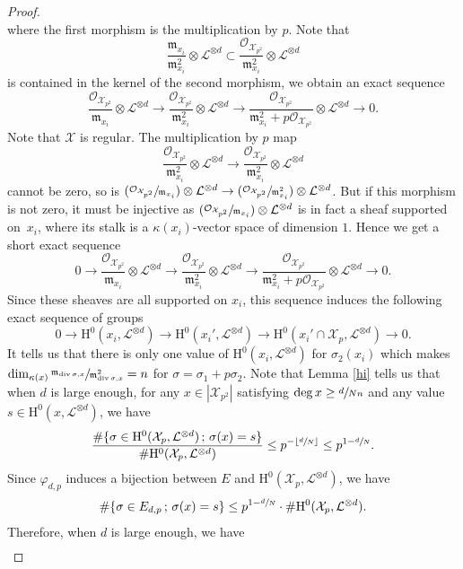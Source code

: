 \documentclass[11pt]{article}
\numberwithin{equation}{section}
\newcommand{\Psfrac}[2]{(\sfrac{#1}{#2})}
\newcommand{\sep}{\,;\,}
\theoremstyle{plain}
\theoremstyle{definition}
\newcommand{\ho}{\mathrm{H}}
\newcommand{\X}{\mathcal{X}}
\newcommand{\li}{\mathcal{L}}
\begin{document}
\begin{proof}
\[\]
where the first morphism is the multiplication by $p$. Note that
\[
\frac{\mathfrak{m}_{x_i}}{\mathfrak{m}_{x_i}^2}\otimes \li^{\otimes d}\subset \frac{\mathcal{O}_{\X_{p^2}}}{\mathfrak{m}_{x_i}^2}\otimes \li^{\otimes d}
\]
is contained in the kernel of the second morphism, we obtain an exact sequence
\[
\frac{\mathcal{O}_{\X_{p^2}}}{\mathfrak{m}_{x_i}}\otimes \li^{\otimes d} \to \frac{\mathcal{O}_{\X_{p^2}}}{\mathfrak{m}_{x_i}^2}\otimes \li^{\otimes d} \to \frac{\mathcal{O}_{\X_{p^2}}}{\mathfrak{m}_{x_i}^2+p\mathcal{O}_{\X_{p^2}}}\otimes \li^{\otimes d}\to 0.
\]
Note that $\X$ is regular. The multiplication by $p$ map
\[
\frac{\mathcal{O}_{\X_{p^2}}}{\mathfrak{m}_{x_i}^2}\otimes \li^{\otimes d} \to \frac{\mathcal{O}_{\X_{p^2}}}{\mathfrak{m}_{x_i}^2}\otimes \li^{\otimes d}
\]
cannot be zero, so is $ \Psfrac{\mathcal{O}_{\X_{p^2}}}{\mathfrak{m}_{x_i}}\otimes \li^{\otimes d} \to \Psfrac{\mathcal{O}_{\X_{p^2}}}{\mathfrak{m}_{x_i}^2}\otimes \li^{\otimes d}$. But if this morphism is not zero, it must be injective as $\Psfrac{\mathcal{O}_{\X_{p^2}}}{\mathfrak{m}_{x_i}}\otimes \li^{\otimes d} $ is in fact a sheaf supported on~$x_i$, where its stalk is a $\kappa(x_i)$-vector space of dimension $1$. Hence we get a short exact sequence
\[
0\to \frac{\mathcal{O}_{\X_{p^2}}}{\mathfrak{m}_{x_i}}\otimes \li^{\otimes d} \to \frac{\mathcal{O}_{\X_{p^2}}}{\mathfrak{m}_{x_i}^2}\otimes \li^{\otimes d} \to \frac{\mathcal{O}_{\X_{p^2}}}{\mathfrak{m}_{x_i}^2+p\mathcal{O}_{\X_{p^2}}}\otimes \li^{\otimes d}\to 0.
\]
Since these sheaves are all supported on $x_i$, this sequence induces the following exact sequence of groups
\[
0\to \ho^0(x_i, \li^{\otimes d})\to \ho^0(x_i', \li^{\otimes d}) \to \ho^0(x_i'\cap \X_p, \li^{\otimes d}) \to 0.
\]
It tells us that there is only one value of $ \ho^0(x_i, \li^{\otimes d})$ for $\sigma_2(x_i)$ which makes $\dim_{\kappa(x)}\sfrac{\mathfrak{m}_{\operatorname{div} \sigma,x}}{\mathfrak{m}_{\operatorname{div} \sigma,x}^2}=n$ for $\sigma=\sigma_1+p\sigma_2$. Note that Lemma \ref{hi} tells us that when $d$ is large enough, for any $x\in |\X_{p^2}|$ satisfying $\deg x\geq \sfrac{d}{Nn}$ and any value $s\in \ho^0(x,\li^{\otimes d})$, we have
\[
\frac{\#\{ \sigma\in \ho^0(\X_p, \li^{\otimes d})\sep \sigma(x)=s \} }{\#\ho^0(\X_p,\li^{\otimes d})} \leq p^{-\lfloor\sfrac{d}{N}\rfloor} \leq p^{1-\sfrac{d}{N}}.
\]
Since $\varphi_{d,p}$ induces a bijection between $E$ and $\ho^0(\X_p, \li^{\otimes d})$, we have
\[
\#\{ \sigma\in E_{d,p}\sep \sigma(x)=s \} \leq p^{1-\sfrac{d}{N}}\cdot \#\ho^0(\X_p, \li^{\otimes d}).
\]
Therefore, when $d$ is large enough, we have
\begin{multline*}

\end{multline*}
\end{proof}
\end{document}
